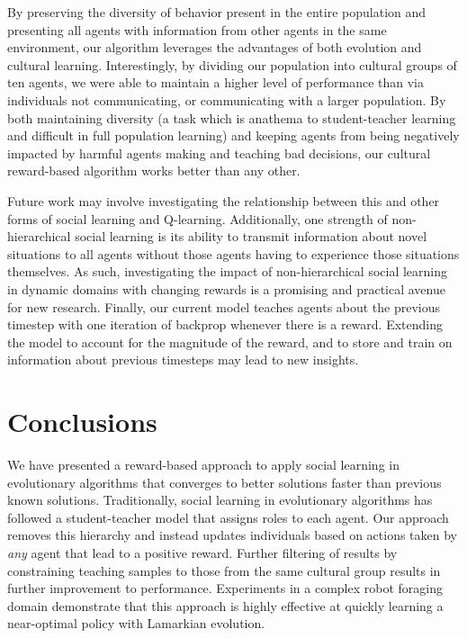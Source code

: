 \documentclass{acm_proc_article-sp}
\begin{document}
By preserving the diversity of behavior present in the entire population and presenting all agents with information from other agents in the same environment, our algorithm leverages the advantages of both evolution and cultural learning. Interestingly, by dividing our population into cultural groups of ten agents, we were able to maintain a higher level of performance than via individuals not communicating, or communicating with a larger population.  By both maintaining diversity (a task which is anathema to student-teacher learning and difficult in full population learning) and keeping agents from being negatively impacted by harmful agents making and teaching bad decisions, our cultural reward-based algorithm works better than any other.

Future work may involve investigating the relationship between this and other forms of social learning and Q-learning.  Additionally, one strength of non-hierarchical social learning is its ability to transmit information about novel situations to all agents without those agents having to experience those situations themselves.  As such, investigating the impact of non-hierarchical social learning in dynamic domains with changing rewards is a promising and practical avenue for new research.  Finally, our current model teaches agents about the previous timestep with one iteration of backprop whenever there is a reward.  Extending the model to account for the magnitude of the reward, and to store and train on information about previous timesteps may lead to new insights.   

\section{Conclusions}
\label{sec:conclusions}

We have presented a reward-based approach to apply social learning in evolutionary algorithms that converges to better solutions faster than previous known solutions. Traditionally, social learning in evolutionary algorithms has followed a student-teacher model that assigns roles to each agent. Our approach removes this hierarchy and instead updates individuals based on actions taken by \textit{any} agent that lead to a positive reward.  Further filtering of results by constraining teaching samples to those from the same cultural group results in further improvement to performance.  Experiments in a complex robot foraging domain demonstrate that this approach is highly effective at quickly learning a near-optimal policy with Lamarkian evolution. 



\end{document}
